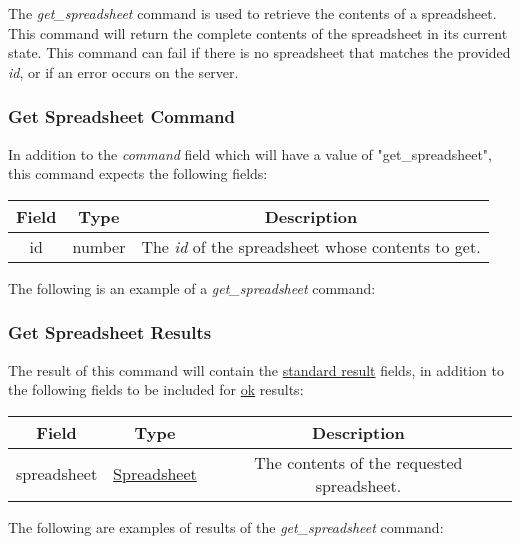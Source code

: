 The \emph{get\_spreadsheet} command is used to retrieve the contents of a 
spreadsheet. This command will return the complete contents of the 
spreadsheet in its current state. This command can fail if there is no 
spreadsheet that matches the provided \emph{id}, or if an error occurs on the 
server.

\subsubsection{Get Spreadsheet Command}
In addition to the \emph{command} field which will have a value of "get\_spreadsheet", this command expects the following fields:
\begin{table}[H]
    \begin{center}
        \begin{tabular}{|c|c|c|}\hline
            Field & Type & Description \\\hline
            id & number & The \emph{id} of the spreadsheet whose contents to get. \\\hline
        \end{tabular}
    \end{center}
\end{table}

The following is an example of a \emph{get\_spreadsheet} command:


\subsubsection{Get Spreadsheet Results}
The result of this command will contain the \hyperref[sec:message:result]{standard result} fields, in addition to the following fields to be included for \underline{ok} results:
\begin{table}[H]
    \begin{center}
        \begin{tabular}{|c|c|c|}\hline
            Field & Type & Description \\\hline
            spreadsheet & \hyperref[sec:message:spreadsheet]{Spreadsheet} & The contents of the requested spreadsheet. \\\hline
        \end{tabular}
    \end{center}
\end{table}

The following are examples of results of the \emph{get\_spreadsheet} command:



